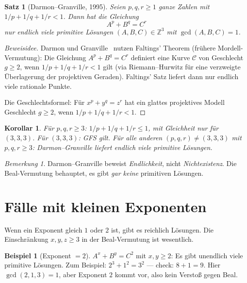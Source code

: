 \documentclass[12pt,a4paper]{amsart}
\newtheorem{satz}[theorem]{Satz}
\newtheorem{korollar}[theorem]{Korollar}
\theoremstyle{definition}
\newtheorem{beispiel}[theorem]{Beispiel}
\theoremstyle{remark}
\newtheorem{bemerkung}[theorem]{Bemerkung}
\begin{document}
\begin{satz}[Darmon--Granville, 1995]\label{satz:DG}
Seien $p, q, r \geq 1$ ganze Zahlen mit $1/p + 1/q + 1/r < 1$. Dann hat die Gleichung
\[
  A^p + B^q = C^r
\]
nur endlich viele primitive Lösungen $(A, B, C) \in \mathbb{Z}^3$ mit $\gcd(A, B, C) = 1$.
\end{satz}

\begin{proof}[Beweisidee]
Darmon und Granville~\cite{DG95} nutzen Faltings' Theorem (frühere Mordell-Vermutung):
Die Gleichung $A^p + B^q = C^r$ definiert eine Kurve $\mathcal{C}$ von Geschlecht
$g \geq 2$, wenn $1/p + 1/q + 1/r < 1$ gilt (via Riemann--Hurwitz für eine
verzweigte Überlagerung der projektiven Geraden). Faltings' Satz liefert dann
nur endlich viele rationale Punkte.

Die Geschlechtsformel: Für $x^p + y^q = z^r$ hat ein glattes projektives Modell
Geschlecht $g \geq 2$, wenn $1/p + 1/q + 1/r < 1$.
\end{proof}

\begin{korollar}
Für $p, q, r \geq 3$: $1/p + 1/q + 1/r \leq 1$, mit Gleichheit nur für $(3,3,3)$.
Für $(3,3,3)$: GFS gilt. Für alle anderen $(p,q,r) \neq (3,3,3)$ mit $p,q,r \geq 3$:
Darmon--Granville liefert endlich viele primitive Lösungen.
\end{korollar}

\begin{bemerkung}
Darmon--Granville beweist \emph{Endlichkeit}, nicht \emph{Nichtexistenz}.
Die Beal-Vermutung behauptet, es gibt \emph{gar keine} primitiven Lösungen.
\end{bemerkung}

\section{Fälle mit kleinen Exponenten}

Wenn ein Exponent gleich $1$ oder $2$ ist, gibt es reichlich Lösungen.
Die Einschränkung $x,y,z \geq 3$ in der Beal-Vermutung ist wesentlich.

\begin{beispiel}[Exponent $= 2$]
$A^x + B^y = C^2$ mit $x,y \geq 2$: Es gibt unendlich viele primitive Lösungen.
Zum Beispiel: $2^3 + 1^2 = 3^2$ — check: $8 + 1 = 9$. Hier $\gcd(2,1,3) = 1$,
aber Exponent $2$ kommt vor, also kein Verstoß gegen Beal.
\end{beispiel}
\end{document}
